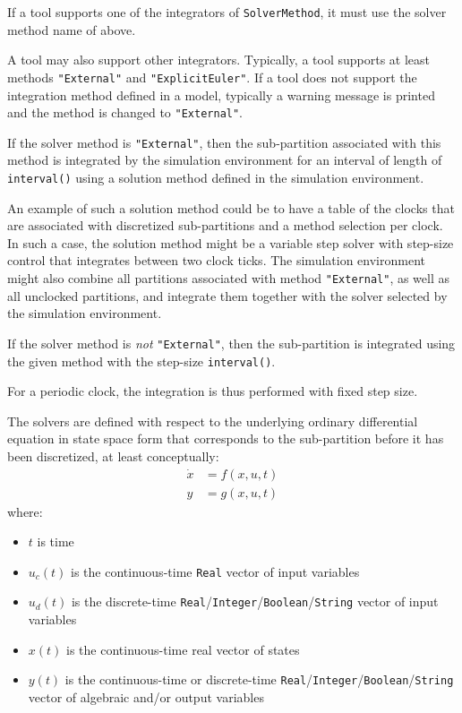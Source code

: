 If a tool supports one of the integrators of \lstinline!SolverMethod!, it must use the solver method name of above.

\begin{nonnormative}
A tool may also support other integrators.
Typically, a tool supports at least methods \lstinline!"External"! and \lstinline!"ExplicitEuler"!.
If a tool does not support the integration method defined in a model, typically a warning message is printed and the method is changed to \lstinline!"External"!.
\end{nonnormative}

If the solver method is \lstinline!"External"!, then the sub-partition associated with this method is integrated by the simulation environment for an interval of length of \lstinline!interval()! using a solution method defined in the simulation environment.

\begin{nonnormative}
An example of such a solution method could be to have a table of the clocks that are associated with discretized sub-partitions and a method selection per clock.
In such a case, the solution method might be a variable step solver with step-size control that integrates between two clock ticks.
The simulation environment might also combine all partitions associated with method \lstinline!"External"!, as well as all unclocked partitions, and integrate them together with the solver selected by the simulation environment.
\end{nonnormative}

If the solver method is \emph{not} \lstinline!"External"!, then the sub-partition is integrated using the given method with the step-size \lstinline!interval()!.

\begin{nonnormative}
For a periodic clock, the integration is thus performed with fixed step size.
\end{nonnormative}

The solvers are defined with respect to the underlying ordinary differential equation in state space form that corresponds to the sub-partition before it has been discretized, at least conceptually:
\begin{align*}
\dot{x} &= f(x, u, t)\\
y &= g(x, u, t)
\end{align*}
where:
\begin{itemize}
\item $t$ is time
\item $u_{c}(t)$ is the continuous-time \lstinline!Real! vector of input variables
\item $u_{d}(t)$ is the discrete-time \lstinline!Real!/\lstinline!Integer!/\lstinline!Boolean!/\lstinline!String! vector of input variables
\item $x(t)$ is the continuous-time real vector of states
\item $y(t)$ is the continuous-time or discrete-time \lstinline!Real!/\lstinline!Integer!/\lstinline!Boolean!/\lstinline!String! vector of algebraic and/or output variables
\end{itemize}

